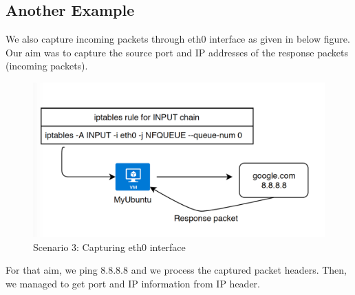 \documentclass[paper=a4, fontsize=11pt]{scrartcl}
\numberwithin{equation}{section}		%
\numberwithin{figure}{section}			%
\numberwithin{table}{section}				%
\begin{document}
\subsection{Another Example}
We also capture incoming packets through eth0 interface as given in below figure. Our aim was to capture the source port and IP addresses of the response packets (incoming packets). 
\begin{figure}[H]
\centering
\includegraphics[width=\textwidth]{img/ex.png}
\caption{Scenario 3: Capturing eth0 interface}
\end{figure}

For that aim, we ping 8.8.8.8 and we process the captured packet headers. Then, we managed to get port and IP information from IP header.
\end{document}
